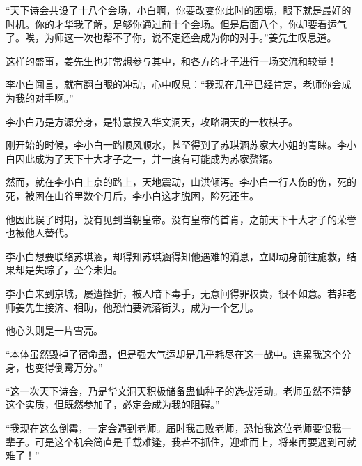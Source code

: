 \begin{this_body}
“天下诗会共设了十八个会场，小白啊，你要改变你此时的困境，眼下就是最好的时机。你的才华我了解，足够你通过前十个会场。但是后面八个，你却要看运气了。唉，为师这一次也帮不了你，说不定还会成为你的对手。”姜先生叹息道。

这样的盛事，姜先生也非常想参与其中，和各方的才子进行一场交流和较量！

李小白闻言，就有翻白眼的冲动，心中叹息：“我现在几乎已经肯定，老师你会成为我的对手啊。”

李小白乃是方源分身，是特意投入华文洞天，攻略洞天的一枚棋子。

刚开始的时候，李小白一路顺风顺水，甚至得到了苏琪涵苏家大小姐的青睐。李小白因此成为了天下十大才子之一，并一度有可能成为苏家赘婿。

然而，就在李小白上京的路上，天地震动，山洪倾泻。李小白一行人伤的伤，死的死，被困在山谷里数个月后，李小白这才脱困，险死还生。

他因此误了时期，没有见到当朝皇帝。没有皇帝的首肯，之前天下十大才子的荣誉也被他人替代。

李小白想要联络苏琪涵，却得知苏琪涵得知他遇难的消息，立即动身前往施救，结果却是失踪了，至今未归。

李小白来到京城，屡遭挫折，被人暗下毒手，无意间得罪权贵，很不如意。若非老师姜先生接济、相助，他恐怕要流落街头，成为一个乞儿。

他心头则是一片雪亮。

“本体虽然毁掉了宿命蛊，但是强大气运却是几乎耗尽在这一战中。连累我这个分身，也变得倒霉万分。”

“这一次天下诗会，乃是华文洞天积极储备蛊仙种子的选拔活动。老师虽然不清楚这个实质，但既然参加了，必定会成为我的阻碍。”

“我现在这么倒霉，一定会遇到老师。届时我击败老师，恐怕我这位老师要恨我一辈子。可是这个机会简直是千载难逢，我若不抓住，迎难而上，将来再要遇到可就难了！”

\end{this_body}

